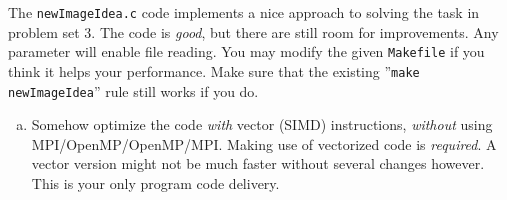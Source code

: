 \documentclass[10pt,a4paper]{article}
\begin{document}
The \texttt{newImageIdea.c} code implements a nice approach to solving the task in problem set 3. The code is \emph{good}, but there are still room for improvements. Any parameter will enable file reading. You may modify the given \texttt{Makefile} if you think it helps your performance. Make sure that the existing ''\texttt{make newImageIdea}'' rule still works if you do.
\begin{enumerate}[a)]

	\item Somehow optimize the code \emph {with} vector (SIMD) instructions, \emph {without} using MPI/OpenMP/OpenMP/MPI. Making use of vectorized code is \emph {required}. A vector version might not be much faster without several changes however. This is your only program code delivery.


\end{enumerate}
\end{document}
